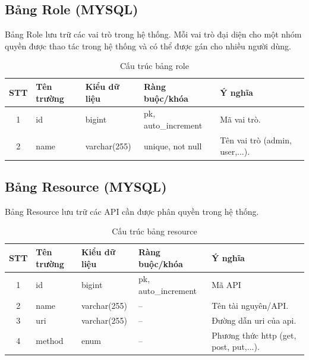 \documentclass[../DoAn.tex]{subfiles}
\begin{document}
\subsection{Bảng Role (MYSQL)}
Bảng Role lưu trữ các vai trò trong hệ thống. Mỗi vai trò đại diện cho một nhóm quyền được thao tác trong hệ thống và có thể được gán cho nhiều người dùng.
\begin{table}[htbp]
    \centering
    \small
    \renewcommand{\arraystretch}{1.3}
    \label{tab:role-structure}
    \begin{tabularx}{\textwidth}{|c|l|l|l|>{\raggedright\arraybackslash}X|}
        \hline
        \textbf{STT} & \textbf{Tên trường} & \textbf{Kiểu dữ liệu} & \textbf{Ràng buộc/khóa} & \textbf{Ý nghĩa}               \\
        \hline
        1            & id                  & bigint                & pk, auto\_increment     & Mã vai trò.                    \\
        \hline
        2            & name                & varchar(255)          & unique, not null        & Tên vai trò (admin, user,...). \\
        \hline
    \end{tabularx}
    \caption{Cấu trúc bảng role}
\end{table}

\subsection{Bảng Resource (MYSQL)}
Bảng Resource lưu trữ các API cần được phân quyền trong hệ thống.
\begin{table}[htbp]
    \centering
    \small
    \renewcommand{\arraystretch}{1.3}
    \label{tab:resource-structure}
    \begin{tabularx}{\textwidth}{|c|l|l|l|>{\raggedright\arraybackslash}X|}
        \hline
        \textbf{STT} & \textbf{Tên trường} & \textbf{Kiểu dữ liệu} & \textbf{Ràng buộc/khóa} & \textbf{Ý nghĩa}                       \\
        \hline
        1            & id                  & bigint                & pk, auto\_increment     & Mã API                                 \\
        \hline
        2            & name                & varchar(255)          & --                      & Tên tài nguyên/API.                    \\
        \hline
        3            & uri                 & varchar(255)          & --                      & Đường dẫn uri của api.                 \\
        \hline
        4            & method              & enum                  & --                      & Phương thức http (get, post, put,...). \\
        \hline
    \end{tabularx}
    \caption{Cấu trúc bảng resource}
\end{table}
\end{document}
